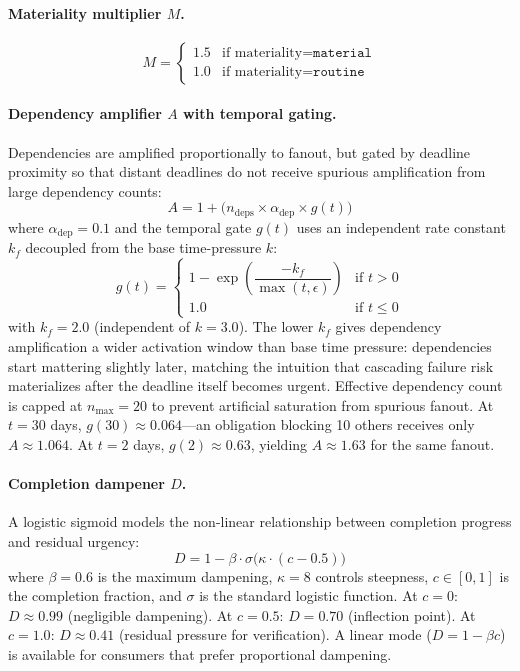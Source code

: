 \documentclass[11pt]{article}
\begin{document}
\paragraph{Materiality multiplier $M$.}
\begin{equation}
M =
\begin{cases}
  1.5 & \text{if materiality} = \texttt{material} \\
  1.0 & \text{if materiality} = \texttt{routine}
\end{cases}
\end{equation}

\paragraph{Dependency amplifier $A$ with temporal gating.}
Dependencies are amplified proportionally to fanout, but gated by
deadline proximity so that distant deadlines do not receive spurious
amplification from large dependency counts:
\begin{equation}
\label{eq:dep}
A = 1 + \bigl(n_{\text{deps}} \times \alpha_{\text{dep}}
    \times g(t)\bigr)
\end{equation}
where $\alpha_{\text{dep}} = 0.1$ and the temporal gate
$g(t)$ uses an independent rate constant $k_f$ decoupled from the
base time-pressure $k$:
\begin{equation}
\label{eq:gate}
g(t) =
\begin{cases}
  1 - \exp\!\left(\dfrac{-k_f}{\max(t, \epsilon)}\right)
    & \text{if } t > 0 \\[4pt]
  1.0 & \text{if } t \leq 0
\end{cases}
\end{equation}
with $k_f = 2.0$ (independent of $k = 3.0$).
The lower $k_f$ gives dependency amplification a wider activation
window than base time pressure: dependencies start mattering slightly
later, matching the intuition that cascading failure risk materializes
after the deadline itself becomes urgent.
Effective dependency count is capped at $n_{\text{max}} = 20$ to
prevent artificial saturation from spurious fanout.
At $t = 30$ days, $g(30) \approx 0.064$---an obligation blocking 10
others receives only $A \approx 1.064$.
At $t = 2$ days, $g(2) \approx 0.63$, yielding $A \approx 1.63$ for
the same fanout.

\paragraph{Completion dampener $D$.}
A logistic sigmoid models the non-linear relationship between
completion progress and residual urgency:
\begin{equation}
\label{eq:damp}
D = 1 - \beta \cdot \sigma\!\bigl(\kappa \cdot (c - 0.5)\bigr)
\end{equation}
where $\beta = 0.6$ is the maximum dampening, $\kappa = 8$ controls
steepness, $c \in [0, 1]$ is the completion fraction, and $\sigma$
is the standard logistic function.
At $c = 0$: $D \approx 0.99$ (negligible dampening).
At $c = 0.5$: $D = 0.70$ (inflection point).
At $c = 1.0$: $D \approx 0.41$ (residual pressure for verification).
A linear mode ($D = 1 - \beta c$) is available for consumers that
prefer proportional dampening.
\end{document}
